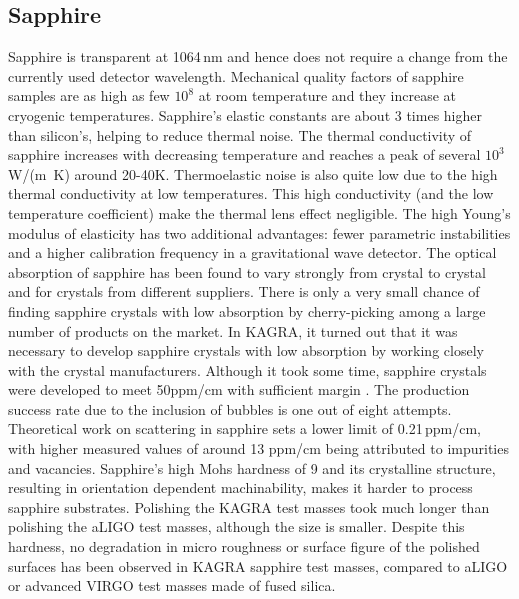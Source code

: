 \subsection{Sapphire}
Sapphire is transparent at 1064\,nm and hence does not require a change from the currently used detector wavelength. Mechanical quality factors of sapphire samples are as high as few $10^8$ at room temperature\cite{Rowan_2000a} and they increase at cryogenic temperatures\cite{uchiyama1999mechanical}. 
Sapphire's elastic constants are about 3 times higher than silicon's, helping to reduce thermal noise. The thermal conductivity of sapphire increases with decreasing temperature and reaches a peak of several $10^3$\,W/(m \,K) around 20-40K.  Thermoelastic noise is also quite low due to the high thermal conductivity at low temperatures.  This high conductivity (and the low temperature coefficient) make the thermal lens effect negligible. The high Young's modulus of elasticity has two additional advantages: fewer parametric instabilities and a higher calibration frequency in a gravitational wave detector.
The optical absorption of sapphire has been found to vary strongly from crystal to crystal and for crystals from different suppliers. There is only a very small chance of finding sapphire crystals with low absorption by cherry-picking among a large number of products on the market. In KAGRA, it turned out that it was necessary to develop sapphire crystals with low absorption by working closely with the crystal manufacturers. Although it took some time, sapphire crystals were developed to meet 50ppm/cm with sufficient margin \cite{Hirose_2014a}. The production success rate due to the inclusion of bubbles is one out of eight attempts.
Theoretical work on scattering in sapphire sets a lower limit of 0.21\,ppm/cm, with higher measured values of around 13 ppm/cm being attributed to impurities and vacancies.
Sapphire's high Mohs hardness of 9 and its crystalline structure, resulting in orientation dependent machinability, makes it harder to process sapphire substrates. Polishing the KAGRA test masses took much longer than polishing the aLIGO test masses, although the size is smaller. Despite this hardness, no degradation in micro roughness or surface figure of the polished surfaces has been observed in KAGRA sapphire test masses\cite{Hirose_2014a}, compared to aLIGO or advanced VIRGO test masses made of fused silica. 

